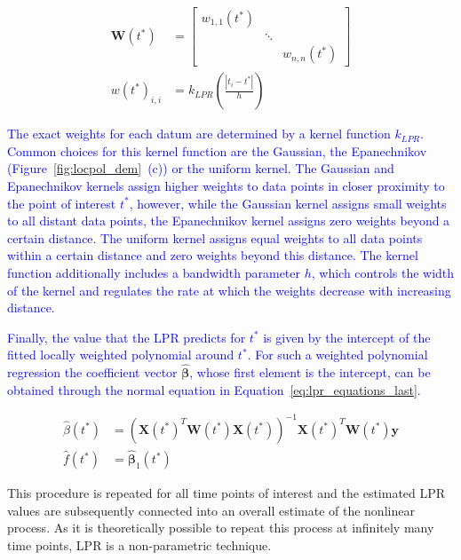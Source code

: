 \documentclass[man, floatsintext]{apa7}
\begin{document}
\begin{align}
  \textbf{W}(t^*) & =
  \begin{bmatrix}
    w_{1, 1}(t^*) &        &               \\
                  & \ddots &               \\
                  &        & w_{n, n}(t^*)
  \end{bmatrix}               \\
  w(t^*)_{i, i}   & = k_{LPR}(\frac{|t_i - t^*|}{h})
  \label{eq:lpr_equations_weights}
\end{align}

\noindent\textcolor{blue}{ The exact weights for each datum are determined by a
  kernel function $k_{LPR}$. Common choices for this kernel function are the
  Gaussian, the Epanechnikov (Figure~\ref{fig:locpol_dem}~(c)) or the uniform
  kernel. The Gaussian and Epanechnikov kernels assign higher weights to data
  points in closer proximity
  to the point of interest $t^*$, however, while the Gaussian kernel assigns
  small weights to all distant data points, the Epanechnikov kernel assigns
  zero weights beyond a certain distance. The uniform kernel assigns equal
  weights to all data points within a certain distance and zero weights
  beyond this distance. The kernel function additionally
  includes a bandwidth parameter $h$, which controls the width of the kernel
  and regulates the rate at which the weights decrease with increasing
  distance. }

\textcolor{blue}{
  Finally, the value that the LPR predicts for $t^*$ is given by the intercept
  of the fitted locally weighted polynomial around $t^*$. For such a weighted
  polynomial regression the coefficient vector
}$\hat{\boldsymbol{\beta}}$\textcolor{blue}{, whose first element is the
  intercept, can be obtained through the normal equation in
  Equation~\ref{eq:lpr_equations_last}.
}

\begin{align}
  \hat{\beta}(t^*) & =
  (\textbf{X}(t^*)^T\textbf{W}(t^*)\textbf{X}(t^*))^{-1}
  \textbf{X}(t^*)^T\textbf{W}(t^*)\textbf{y}
  \label{eq:lpr_equations_last}                \\
  \hat{f}(t^*)     & = \hat{\bm{\beta}}_1(t^*)
\end{align}

This procedure is repeated for all
time points of interest and the estimated LPR values are subsequently connected
into an overall estimate of the nonlinear process.
As it is theoretically possible to repeat this process at infinitely many
time points, LPR is a non-parametric technique.
\end{document}
